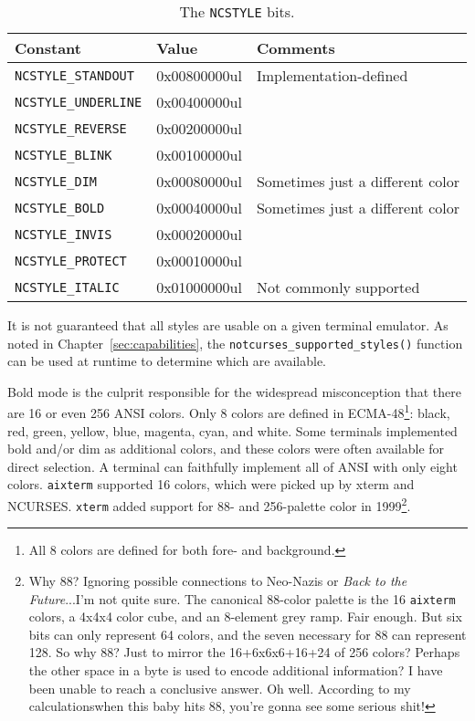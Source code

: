 \begin{table}[!htb]
  \centering
  \begin{tabular}{|l|l|l|}
    \hline
    Constant & Value & Comments \\
    \hline
    \hline
\texttt{NCSTYLE\_STANDOUT} &  0x00800000ul & Implementation-defined \\
\texttt{NCSTYLE\_UNDERLINE} & 0x00400000ul & \\
\texttt{NCSTYLE\_REVERSE} &   0x00200000ul & \\
\texttt{NCSTYLE\_BLINK} &     0x00100000ul & \\
\texttt{NCSTYLE\_DIM} &       0x00080000ul & Sometimes just a different color \\
\texttt{NCSTYLE\_BOLD} &      0x00040000ul & Sometimes just a different color \\
\texttt{NCSTYLE\_INVIS} &     0x00020000ul & \\
\texttt{NCSTYLE\_PROTECT} &   0x00010000ul & \\
\texttt{NCSTYLE\_ITALIC} &    0x01000000ul & Not commonly supported \\
    \hline
  \end{tabular}
  \caption{The \texttt{NCSTYLE} bits.}
  \label{table:styles}
\end{table}

It is not guaranteed that all styles are usable on a given terminal emulator.
As noted in Chapter~\ref{sec:capabilities}, the \texttt{notcurses\_supported\_styles()}
function can be used at runtime to determine which are available. 

Bold mode is the culprit responsible for the widespread misconception that there
are 16 or even 256 ANSI colors. Only 8 colors are defined in
ECMA-48\footnote{All 8 colors are defined for both fore- and background.}:
black, red, green, yellow, blue, magenta, cyan, and white. Some terminals
implemented bold and/or dim as additional colors, and these colors were often
available for direct selection. A terminal can faithfully implement all of ANSI
with only eight colors. \texttt{aixterm} supported 16 colors, which were
picked up by xterm and NCURSES. \texttt{xterm} added support for 88- and 256-palette
color in 1999\footnote{Why 88? Ignoring
possible connections to Neo-Nazis or \textit{Back to the Future}...I'm not quite
sure. The canonical 88-color palette is the 16 \texttt{aixterm} colors, a 4x4x4
color cube, and an 8-element grey ramp. Fair enough. But six bits can only represent
64 colors, and the seven necessary for 88 can represent 128. So why 88? Just to
mirror the 16+6x6x6+16+24 of 256 colors? Perhaps the other space in a byte is
used to encode additional information? I have been unable to reach a conclusive
answer. Oh well. According to my calculations\textellipsis when this baby hits 88, you're gonna see some serious shit!}.


